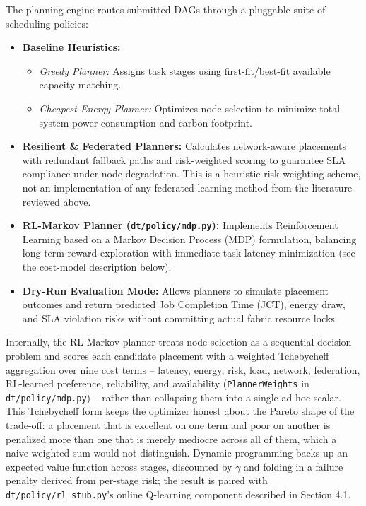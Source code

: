\documentclass[twoside,twocolumn,10pt]{article}
\begin{document}
The planning engine routes submitted DAGs through a pluggable suite of scheduling policies:
\begin{itemize}
    \item \textbf{Baseline Heuristics:} 
    \begin{itemize}
        \item \textit{Greedy Planner:} Assigns task stages using first-fit/best-fit available capacity matching.
        \item \textit{Cheapest-Energy Planner:} Optimizes node selection to minimize total system power consumption and carbon footprint.
    \end{itemize}
    \item \textbf{Resilient \& Federated Planners:} Calculates network-aware placements with redundant fallback paths and risk-weighted scoring to guarantee SLA compliance under node degradation. This is a heuristic risk-weighting scheme, not an implementation of any federated-learning method from the literature reviewed above.
    \item \textbf{RL-Markov Planner (\texttt{dt/policy/mdp.py}):} Implements Reinforcement Learning based on a Markov Decision Process (MDP) formulation, balancing long-term reward exploration with immediate task latency minimization (see the cost-model description below).
    \item \textbf{Dry-Run Evaluation Mode:} Allows planners to simulate placement outcomes and return predicted Job Completion Time (JCT), energy draw, and SLA violation risks without committing actual fabric resource locks.
\end{itemize}

Internally, the RL-Markov planner treats node selection as a sequential decision problem and scores each candidate placement with a weighted Tchebycheff aggregation over nine cost terms -- latency, energy, risk, load, network, federation, RL-learned preference, reliability, and availability (\texttt{PlannerWeights} in \texttt{dt/policy/mdp.py}) -- rather than collapsing them into a single ad-hoc scalar. This Tchebycheff form keeps the optimizer honest about the Pareto shape of the trade-off: a placement that is excellent on one term and poor on another is penalized more than one that is merely mediocre across all of them, which a naive weighted sum would not distinguish. Dynamic programming backs up an expected value function across stages, discounted by $\gamma$ and folding in a failure penalty derived from per-stage risk; the result is paired with \texttt{dt/policy/rl\_stub.py}'s online Q-learning component described in Section 4.1.
\end{document}
